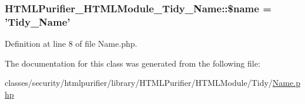 \hypertarget{classHTMLPurifier__HTMLModule__Tidy__Name_aaea38af3cc35162d772bbc432dd2be0c}{
\subsubsection[{\$name}]{\setlength{\rightskip}{0pt plus 5cm}H\+T\+M\+L\+Purifier\+\_\+\+H\+T\+M\+L\+Module\+\_\+\+Tidy\+\_\+\+Name\+::\$name = 'Tidy\+\_\+\+Name'}}\label{classHTMLPurifier__HTMLModule__Tidy__Name_aaea38af3cc35162d772bbc432dd2be0c}


Definition at line 8 of file Name.\+php.



The documentation for this class was generated from the following file\+:\begin{DoxyCompactItemize}
\item 
classes/security/htmlpurifier/library/\+H\+T\+M\+L\+Purifier/\+H\+T\+M\+L\+Module/\+Tidy/\hyperlink{HTMLModule_2Tidy_2Name_8php}{Name.\+php}\end{DoxyCompactItemize}
